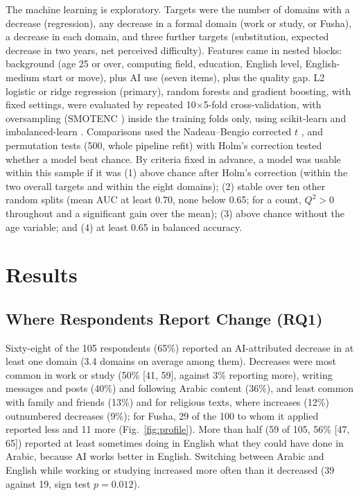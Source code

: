 \documentclass[conference]{IEEEtran}
\begin{document}
The machine learning is exploratory. Targets were the number of domains with a decrease (regression), any decrease in a formal domain (work or study, or Fusha), a decrease in each domain, and three further targets (substitution, expected decrease in two years, net perceived difficulty). Features came in nested blocks: background (age 25 or over, computing field, education, English level, English-medium start or move), plus AI use (seven items), plus the quality gap. L2 logistic or ridge regression (primary), random forests and gradient boosting, with fixed settings, were evaluated by repeated 10$\times$5-fold cross-validation, with oversampling (SMOTENC \cite{chawla2002}) inside the training folds only, using scikit-learn and imbalanced-learn \cite{pedregosa2011,lemaitre2017}. Comparisons used the Nadeau--Bengio corrected $t$ \cite{nadeau2003}, and permutation tests (500, whole pipeline refit) with Holm's correction tested whether a model beat chance. By criteria fixed in advance, a model was usable within this sample if it was (1) above chance after Holm's correction (within the two overall targets and within the eight domains); (2) stable over ten other random splits (mean AUC at least 0.70, none below 0.65; for a count, $Q^2>0$ throughout and a significant gain over the mean); (3) above chance without the age variable; and (4) at least 0.65 in balanced accuracy.

\section{Results}

\subsection{Where Respondents Report Change (RQ1)}

Sixty-eight of the 105 respondents (65\%) reported an AI-attributed decrease in at least one domain (3.4 domains on average among them). Decreases were most common in work or study (50\% [41, 59], against 3\% reporting more), writing messages and posts (40\%) and following Arabic content (36\%), and least common with family and friends (13\%) and for religious texts, where increases (12\%) outnumbered decreases (9\%); for Fusha, 29 of the 100 to whom it applied reported less and 11 more (Fig.~\ref{fig:profile}). More than half (59 of 105, 56\% [47, 65]) reported at least sometimes doing in English what they could have done in Arabic, because AI works better in English. Switching between Arabic and English while working or studying increased more often than it decreased (39 against 19, sign test $p=0.012$).
\end{document}
